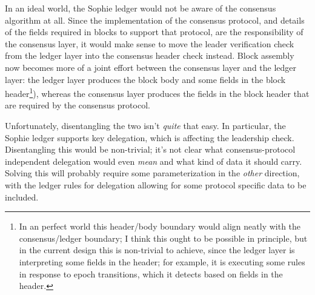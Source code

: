 In an ideal world, the Sophie ledger would not be aware of the consensus
algorithm at all. Since the implementation of the consensus protocol, and
details of the fields required in blocks to support that protocol, are the
responsibility of the consensus layer, it would make sense to move the
leader verification check from the ledger layer into the consensus header check
instead. Block assembly now becomes more of a joint effort between the
consensus layer and the ledger layer: the ledger layer produces the block body
and some fields in the block header\footnote{In an perfect world this
header/body boundary would align neatly with the consensus/ledger boundary; I
think this ought to be possible in principle, but in the current design this is
non-trivial to achieve, since the ledger layer is interpreting some fields in
the header; for example, it is executing some rules in response to epoch
transitions, which it detects based on fields in the header.}), whereas the
consensus layer produces the fields in the block header that are required by the
consensus protocol.

Unfortunately, disentangling the two isn't \emph{quite} that easy. In
particular, the Sophie ledger supports key delegation, which is affecting
the leadership check. Disentangling this would be non-trivial; it's not
clear what consensus-protocol independent delegation would even \emph{mean}
and what kind of data it should carry. Solving this will probably require
some parameterization in the \emph{other} direction, with the ledger
rules for delegation allowing for some protocol specific data to be included.
